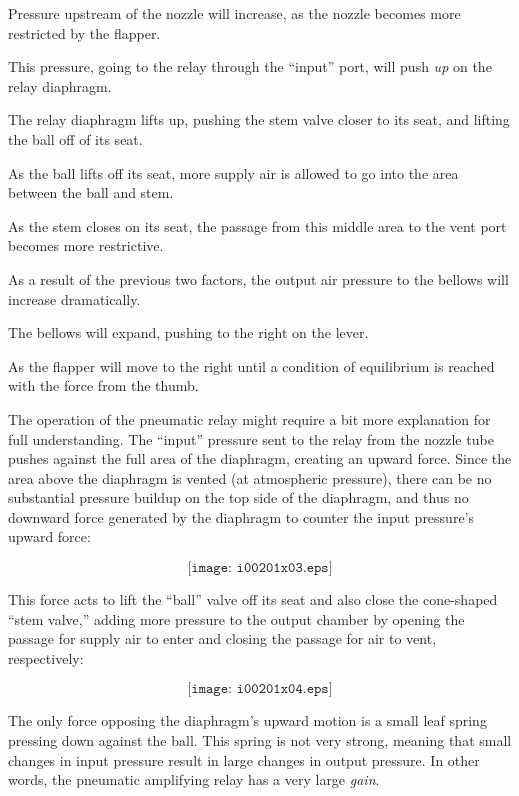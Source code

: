 \medskip
{\item{} Pressure upstream of the nozzle will increase, as the nozzle becomes more restricted by the flapper.
{\item{} This pressure, going to the relay through the ``input'' port, will push {\it up} on the relay diaphragm.
{\item{} The relay diaphragm lifts up, pushing the stem valve closer to its seat, and lifting the ball off of its seat.
{\item{} As the ball lifts off its seat, more supply air is allowed to go into the area between the ball and stem.
{\item{} As the stem closes on its seat, the passage from this middle area to the vent port becomes more restrictive.
{\item{} As a result of the previous two factors, the output air pressure to the bellows will increase dramatically.
{\item{} The bellows will expand, pushing to the right on the lever.
{\item{} As the flapper will move to the right until a condition of equilibrium is reached with the force from the thumb.
\medskip

The operation of the pneumatic relay might require a bit more explanation for full understanding.  The ``input'' pressure sent to the relay from the nozzle tube pushes against the full area of the diaphragm, creating an upward force.  Since the area above the diaphragm is vented (at atmospheric pressure), there can be no substantial pressure buildup on the top side of the diaphragm, and thus no downward force generated by the diaphragm to counter the input pressure's upward force:

$$\texttt{[image: i00201x03.eps]}$$

This force acts to lift the ``ball'' valve off its seat and also close the cone-shaped ``stem valve,'' adding more pressure to the output chamber by opening the passage for supply air to enter and closing the passage for air to vent, respectively:

$$\texttt{[image: i00201x04.eps]}$$

The only force opposing the diaphragm's upward motion is a small leaf spring pressing down against the ball.  This spring is not very strong, meaning that small changes in input pressure result in large changes in output pressure.  In other words, the pneumatic amplifying relay has a very large {\it gain}.

}}}}}}}}
